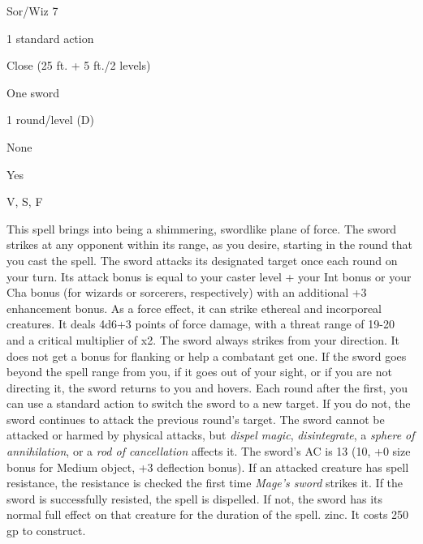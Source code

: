 
\begin{description*}
\item[Level:] Sor/Wiz 7
\item[Casting Time:] 1 standard action
\item[Range:] Close (25 ft. + 5 ft./2 levels)
\item[Effect:] One sword
\item[Duration:] 1 round/level (D)
\item[Saving Throw:] None
\item[Spell Resistance:] Yes
\item[Components:] V, S, F
\end{description*}

This spell brings into being a shimmering, swordlike plane of force. The sword
strikes at any opponent within its range, as you desire, starting in the round
that you cast the spell. The sword attacks its designated target once each round
on your turn. Its attack bonus is equal to your caster level + your Int bonus or
your Cha bonus (for wizards or sorcerers, respectively) with an additional +3 enhancement
bonus. As a force effect, it can strike ethereal and incorporeal creatures. It
deals 4d6+3 points of force damage, with a threat range of 19-20 and a critical
multiplier of x2.
The sword always strikes from your direction. It does not get a bonus for flanking
or help a combatant get one. If the sword goes beyond the spell range from you,
if it goes out of your sight, or if you are not directing it, the sword returns
to you and hovers.
Each round after the first, you can use a standard action to switch the sword to
a new target. If you do not, the sword continues to attack the previous round's
target.
The sword cannot be attacked or harmed by physical attacks, but \textit{dispel
magic}, \textit{disintegrate}, a \textit{sphere of annihilation}, or a \textit{rod
of cancellation} affects it. The sword's AC is 13 (10, +0 size bonus for Medium
object, +3 deflection bonus).
If an attacked creature has spell resistance, the resistance is checked the first
time \textit{Mage's sword} strikes it. If the sword is successfully resisted, the
spell is dispelled. If not, the sword has its normal full effect on that creature
for the duration of the spell.
zinc. It costs 250 gp to construct.